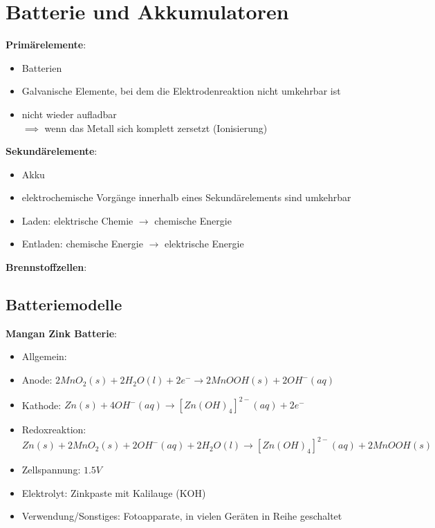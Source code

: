 \section{Batterie und Akkumulatoren}


\textbf{Primärelemente}: 
\begin{itemize}
    \item Batterien
    \item Galvanische Elemente, bei dem die Elektrodenreaktion nicht umkehrbar
        ist 
    \item nicht wieder aufladbar \\
        $\implies$ wenn das Metall sich komplett zersetzt (Ionisierung)
\end{itemize}

\vspace{1cm}

\textbf{Sekundärelemente}: 
\begin{itemize}
    \item Akku
    \item elektrochemische Vorgänge innerhalb eines Sekundärelements sind umkehrbar
    \item Laden: elektrische Chemie $\rightarrow$ chemische Energie
    \item Entladen: chemische Energie $\rightarrow$ elektrische Energie
\end{itemize}

\vspace{1cm}

\textbf{Brennstoffzellen}:


\subsection{Batteriemodelle}

\textbf{Mangan Zink Batterie}:
\begin{itemize}
    \item Allgemein: 
    \item Anode: $2MnO_2(s) + 2H_2O(l) + 2e^- \rightarrow 2MnOOH(s) + 2OH^-(aq)$
    \item Kathode: $Zn(s) + 4OH^-(aq) \rightarrow [Zn(OH)_4]^{2-}(aq) + 2e^-$
    \item Redoxreaktion: $Zn(s) + 2MnO_2(s) + 2OH^-(aq) + 2H_2O(l) \rightarrow
        [Zn(OH)_4]^{2-}(aq) + 2MnOOH(s)$
    \item Zellspannung: $1.5V$
    \item Elektrolyt: Zinkpaste mit Kalilauge (KOH)
    \item Verwendung/Sonstiges: Fotoapparate, in vielen Geräten in Reihe
        geschaltet
\end{itemize}
